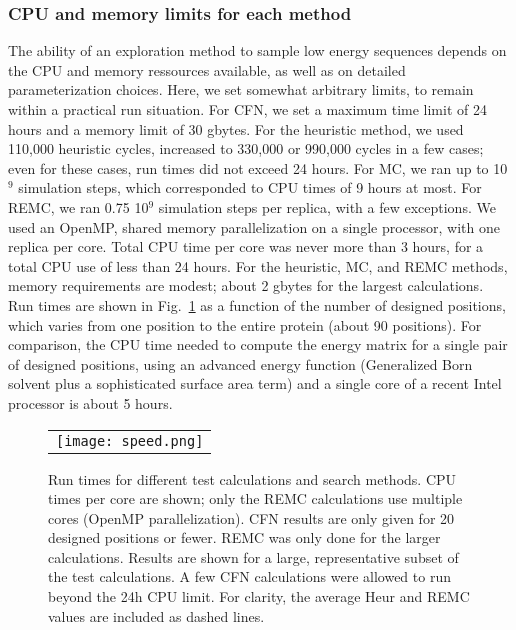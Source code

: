 {{\subsubsection{CPU and memory limits for each method}
The ability of an exploration method to sample low energy sequences depends on the CPU and memory ressources
available, as well as on detailed parameterization choices. Here, we set somewhat arbitrary limits, to remain
within a practical run situation. For CFN, we set a maximum time limit of 24 hours and a memory limit of 30
gbytes. For the heuristic method, we used 110,000 heuristic cycles, increased to 330,000 or 990,000 cycles in a
few cases; even for these cases, run times did not exceed 24 hours. For MC, we ran up to 10$^9$ simulation steps,
which corresponded to CPU times of 9 hours at most. For REMC, we ran 0.75 10$^9$ simulation steps per replica,
with a few exceptions. We used an OpenMP, shared memory parallelization on a single processor, with one replica
per core. Total CPU time per core was never more than 3 hours, for a total CPU use of less than 24 hours. For the
heuristic, MC, and REMC methods, memory requirements are modest; about 2 gbytes for the largest calculations. Run
times are shown in Fig.\ \ref{fig:cpu} as a function of the number of designed positions, which varies from
one position to the entire protein (about 90 positions). For comparison, the CPU time needed to compute the
energy matrix for a single pair of designed positions, using an advanced energy function (Generalized Born
solvent plus a sophisticated surface area term) and a single core of a recent Intel processor is about 5 hours.


    \begin{figure}[!htbp]
      \centering
      \begin{tabular}{c}
        \texttt{[image: speed.png]} 
      \end{tabular}
      \caption{\small 
Run times for different test calculations and search methods. CPU times per core are
shown; only the REMC calculations use multiple cores (OpenMP parallelization). CFN results
are only given for 20 designed positions or fewer. REMC was only done for the larger
calculations. Results are shown for a large, representative subset of the test calculations.
A few CFN calculations were allowed to run beyond the 24h CPU limit. For clarity, the
average Heur and REMC values are included as dashed lines.
}

      \label{fig:cpu}
    \end{figure}



}}
